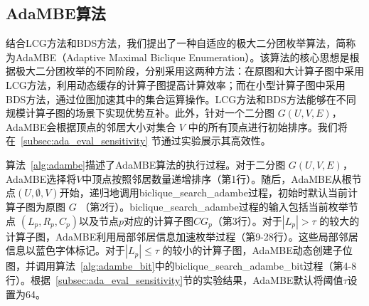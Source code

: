 \subsection{AdaMBE算法}
\label{subsec:ada_design_all}

结合LCG方法和BDS方法，我们提出了一种自适应的极大二分团枚举算法，简称为AdaMBE（Adaptive Maximal Biclique Enumeration）。该算法的核心思想是根据极大二分团枚举的不同阶段，分别采用这两种方法：在原图和大计算子图中采用LCG方法，利用动态缓存的计算子图提高计算效率；而在小型计算子图中采用BDS方法，通过位图加速其中的集合运算操作。LCG方法和BDS方法能够在不同规模计算子图的场景下实现优势互补。此外，针对一个二分图 $G(U,V,E)$，AdaMBE会根据顶点的邻居大小对集合 $V$ 中的所有顶点进行初始排序。我们将在~\ref{subsec:ada_eval_sensitivity} 节通过实验展示其高效性。




算法~\ref{alg:adambe}描述了AdaMBE算法的执行过程。对于二分图 $G(U,V,E)$，AdaMBE选择将$V$中顶点按照邻居数量递增排序（第1行）。随后，AdaMBE从根节点$(U,\emptyset,V)$开始，递归地调用\textsf{biclique\_search\_adambe}过程，初始时默认当前计算子图为原图 $G$ （第2行）。\textsf{biclique\_search\_adambe}过程的输入包括当前枚举节点 $(L_p, R_p, C_p)$以及节点$p$对应的计算子图$CG_p$（第3行）。对于$|L_p| > \tau$ 的较大的计算子图，AdaMBE利用局部邻居信息加速枚举过程（第9-28行）。这些局部邻居信息以蓝色字体标记。对于$|L_p| \le \tau$ 的较小的计算子图，AdaMBE动态创建子位图，并调用算法~\ref{alg:adambe_bit}中的\textsf{biclique\_search\_adambe\_bit}过程（第4-8行）。根据~\ref{subsec:ada_eval_sensitivity}节的实验结果，AdaMBE默认将阈值$\tau$设置为64。






